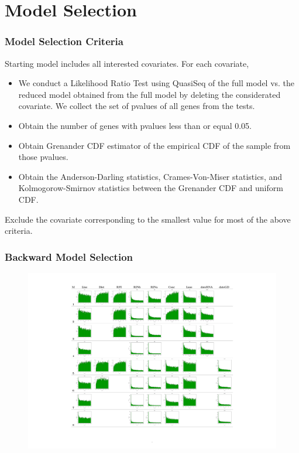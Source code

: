 \documentclass[handout,xcolor=pdftex,dvipsnames,table]{beamer}\usepackage[]{graphicx}\usepackage[]{color}
\begin{document}


\section{Model Selection}
\begin{frame}
\frametitle{Model Selection Criteria}
Starting model includes all interested covariates. For each covariate, 
\begin{itemize}
\setlength{\itemsep}{.2in}
\item We conduct a Likelihood Ratio Test using QuasiSeq of the full model vs. the reduced model obtained from the full model by deleting the considerated covariate. We collect the set of pvalues of all genes from the tests. 

\item Obtain the number of genes with pvalues less than or equal 0.05. 
\item Obtain Grenander CDF estimator of the empirical CDF of the sample from those pvalues.
\item Obtain the Anderson-Darling statistics, Crames-Von-Miser statistics, and Kolmogorow-Smirnov statistics between the Grenander CDF and uniform CDF.
\end{itemize}
Exclude the covariate corresponding to the smallest value for most of the above criteria.
\end{frame}
\begin{frame}[fragile]
\frametitle{Backward Model Selection}
\begin{figure}[h!]
    \centering
    \includegraphics[width=\textwidth,height=1\textheight,keepaspectratio]{Plotmodel.pdf}
    \end{figure}
\end{frame}
\end{document}
